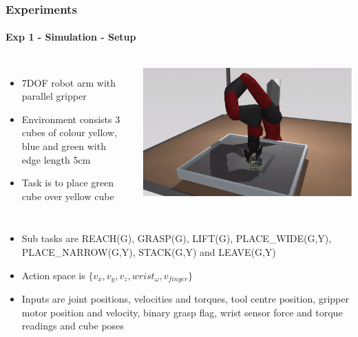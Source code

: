 \documentclass{beamer}
\begin{document}
\begin{frame}
	\frametitle{Experiments}
	\framesubtitle{Exp 1 - Simulation - Setup}
	
	\begin{columns}[c]
		

		\begin{itemize}
			\item 7DOF robot arm with parallel gripper
			\item Environment consists 3 cubes of colour yellow, blue and green with edge length 5cm
			\item Task is to place green cube over yellow cube
		\end{itemize}
		
		\includegraphics[scale=0.2]{sim1.png}
		
	\end{columns}

	\begin{itemize}
		\item Sub tasks are REACH(G), GRASP(G), LIFT(G), PLACE\_WIDE(G,Y), PLACE\_NARROW(G,Y), STACK(G,Y)  and LEAVE(G,Y)
		\item Action space is $\{v_x, v_y, v_z, wrist_{\omega}, v_{finger}\}$
		\item Inputs are joint positions, velocities and torques, tool centre position, gripper motor position and velocity, binary grasp flag, wrist sensor force and torque readings and cube poses
	\end{itemize}
\end{frame}
\end{document}
